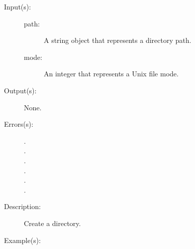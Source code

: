 \begin{description}
\begin{description}
\begin{verbatim}
		\end{verbatim}
	\end{description}
\label{systemdict:mkdir}
\item[{\onyxop{path}{mkdir}{--}}: ]
\item[{\onyxop{path mode}{mkdir}{--}}: ]
	\begin{description}\item[]
	\item[Input(s): ]
		\begin{description}\item[]
		\item[path: ]
			A string object that represents a directory path.
		\item[mode: ]
			An integer that represents a Unix file mode.
		\end{description}
	\item[Output(s): ] None.
	\item[Errors(s): ]
		\begin{description}\item[]
		\item[.]
		\item[.]
		\item[.]
		\item[.]
		\item[.]
		\item[.]
		\end{description}
	\item[Description: ]
		Create a directory.
	\item[Example(s): ]\begin{verbatim}


\end{verbatim}
\end{description}
\end{description}

